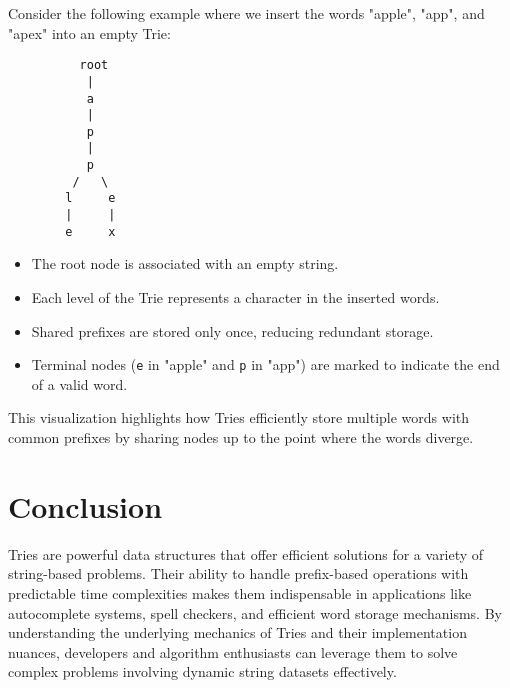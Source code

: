 
Consider the following example where we insert the words "apple", "app", and "apex" into an empty Trie:

\begin{verbatim}
          root
           |
           a
           |
           p
           |
           p
         /   \
        l     e
        |     |
        e     x
\end{verbatim}

\begin{itemize}
    \item The root node is associated with an empty string.
    \item Each level of the Trie represents a character in the inserted words.
    \item Shared prefixes are stored only once, reducing redundant storage.
    \item Terminal nodes (\texttt{e} in "apple" and \texttt{p} in "app") are marked to indicate the end of a valid word.
\end{itemize}

This visualization highlights how Tries efficiently store multiple words with common prefixes by sharing nodes up to the point where the words diverge.

\section*{Conclusion}

Tries are powerful data structures that offer efficient solutions for a variety of string-based problems. Their ability to handle prefix-based operations with predictable time complexities makes them indispensable in applications like autocomplete systems, spell checkers, and efficient word storage mechanisms. By understanding the underlying mechanics of Tries and their implementation nuances, developers and algorithm enthusiasts can leverage them to solve complex problems involving dynamic string datasets effectively.

\printindex